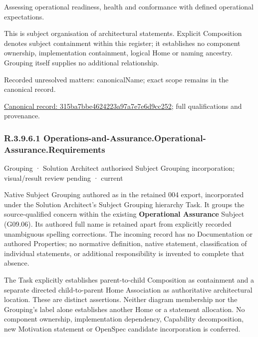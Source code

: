 Assessing operational readiness, health and conformance with defined operational expectations.



This is subject organisation of architectural statements. Explicit Composition denotes subject containment within this register; it establishes no component ownership, implementation containment, logical Home or naming ancestry. Grouping itself supplies no additional relationship.


{\small Recorded unresolved matters: canonicalName; exact scope remains in the canonical record.}\par
{\footnotesize \href{../../../../continuum/grouping/315ba7bbe4624223a97a7e7e6d9cc252.md}{Canonical record: 315ba7bbe4624223a97a7e7e6d9cc252}; full qualifications and provenance.}\par
\subsubsection*{R.3.9.6.1 Operations-and-Assurance.Operational-Assurance.Requirements}
\label{navigation:R.3.9.6.1}

\label{element:3189d80ed4c24efe9bfc6b28ab263b51}
{\small Grouping · Solution Architect authorised Subject Grouping incorporation; visual/result review pending · current}\par

Native Subject Grouping authored as \texttt{} in the retained 004 export,
incorporated under the Solution Architect's Subject Grouping hierarchy Task.
It groups the source-qualified \texttt{} concern within
the existing \textbf{Operational Assurance} Subject (G09.06). Its authored full name
is retained apart from explicitly recorded unambiguous spelling corrections.
The incoming record has no Documentation or authored Properties; no normative
definition, native statement, classification of individual statements, or
additional responsibility is invented to complete that absence.



The Task explicitly establishes parent-to-child Composition as containment and
a separate directed child-to-parent Home Association as authoritative architectural
location. These are distinct assertions. Neither diagram membership nor the
Grouping's label alone establishes another Home or a statement allocation.
No component ownership, implementation dependency, Capability decomposition,
new Motivation statement or OpenSpec candidate incorporation is conferred.



